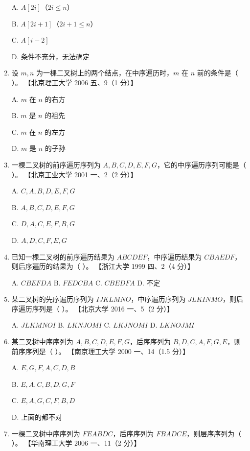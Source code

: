 \documentclass[lang=cn,newtx,10pt,scheme=chinese]{../../elegantbook}
\begin{document}
\begin{enumerate}
    A. $A[2i]$（$2i ≤ n$）  

    B. $A[2i+1]$（$2i+1 ≤ n$） 

    C. $A[i-2]$  

    D. 条件不充分，无法确定  

    \item 设 $m, n$ 为一棵二叉树上的两个结点，在中序遍历时，$m$ 在 $n$ 前的条件是（ ）。  
    【北京理工大学 2006 五、9（1 分）】  

    A. $m$ 在 $n$ 的右方 

    B. $m$ 是 $n$ 的祖先  

    C. $m$ 在 $n$ 的左方  

    D. $m$ 是 $n$ 的子孙  

    \item 一棵二叉树的前序遍历序列为 $A, B, C, D, E, F, G$，它的中序遍历序列可能是（ ）。  
    【北京工业大学 2001 一、2（2 分）】 

    A. $C, A, B, D, E, F, G$  

    B. $A, B, C, D, E, F, G$  

    C. $D, A, C, E, F, B, G$  

    D. $A, D, C, F, E, G$  

    \item 已知一棵二叉树的前序遍历结果为 $ABCDEF$，中序遍历结果为 $CBAEDF$，则后序遍历的结果为（ ）。  
    【浙江大学 1999 四、2（4 分）】  

    A. $ CBEFDA$ \quad B. $FEDCBA $ \quad C. $CBEDFA $ \quad D. 不定  

    \item 某二叉树的先序遍历序列为 $IJKLMNO$，中序遍历序列为 $JLKINMO$，则后序遍历序列是（ ）。  
    【北京大学 2016 一、5（2 分）】  

    A. $JLKMNOI$ \quad B. $LKNJOMI$ \quad C. $LKJNOMI$ \quad D. $LKNOJMI$  

    \item 某二叉树中序序列为 $A, B, C, D, E, F,G$，后序序列为 $B, D, C, A,F, G, E$，则前序序列是（ ）。  
    【南京理工大学 2000 一、14（1.5 分）】  

    A. $E, G, F, A, C, D,B$  

    B. $E,A,C,B,D,G,F$  

    C. $E,A,G,C,F,B,D$  

    D. 上面的都不对  

    \item 一棵二叉树中序序列为 $FEABDC$，后序序列为 $FBADCE$，则层序序列为（ ）。  
    【华南理工大学 2006 一、11（2 分）】  


\end{enumerate}
\end{document}
